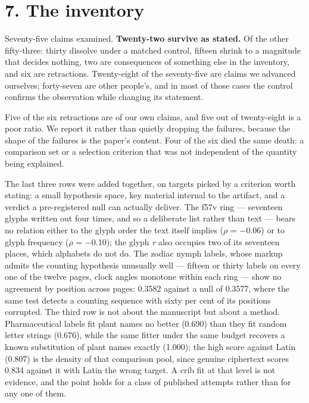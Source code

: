 \documentclass[11pt,a4paper]{article}
\begin{document}
\section*{7. The inventory}


Seventy-five claims examined. \textbf{Twenty-two survive as stated.} Of the other fifty-three: thirty dissolve under a matched control, fifteen shrink to a magnitude that decides nothing, two are consequences of something else in the inventory, and six are retractions. Twenty-eight of the seventy-five are claims we advanced ourselves; forty-seven are other people's, and in most of those cases the control confirms the observation while changing its statement.


Five of the six retractions are of our own claims, and five out of twenty-eight is a poor ratio. We report it rather than quietly dropping the failures, because the shape of the failures is the paper's content. Four of the six died the same death: a comparison set or a selection criterion that was not independent of the quantity being explained.


The last three rows were added together, on targets picked by a criterion worth stating: a small hypothesis space, key material internal to the artifact, and a verdict a pre-registered null can actually deliver. The f57v ring --- seventeen glyphs written out four times, and so a deliberate list rather than text --- bears no relation either to the glyph order the text itself implies ($\rho$ = $-$0.06) or to glyph frequency ($\rho$ = $-$0.10); the glyph \emph{r} also occupies two of its seventeen places, which alphabets do not do. The zodiac nymph labels, whose markup admits the counting hypothesis unusually well --- fifteen or thirty labels on every one of the twelve pages, clock angles monotone within each ring --- show no agreement by position across pages: 0.3582 against a null of 0.3577, where the same test detects a counting sequence with sixty per cent of its positions corrupted. The third row is not about the manuscript but about a method. Pharmaceutical labels fit plant names no better (0.690) than they fit random letter strings (0.676), while the same fitter under the same budget recovers a known substitution of plant names exactly (1.000); the high score against Latin (0.807) is the density of that comparison pool, since genuine ciphertext scores 0.834 against it with Latin the wrong target. A crib fit at that level is not evidence, and the point holds for a class of published attempts rather than for any one of them.
\end{document}
